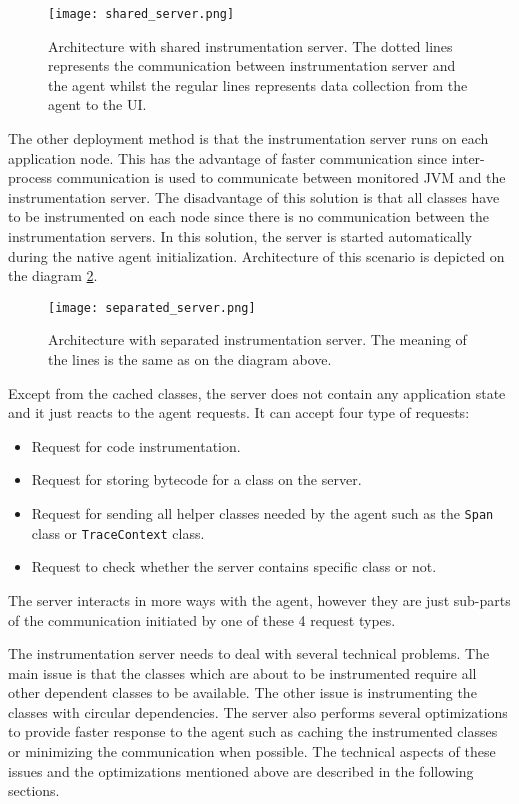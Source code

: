  \begin{figure}
 	\centering
 	\texttt{[image: shared\_server.png]}
 	\caption{Architecture with shared instrumentation server. The dotted lines represents the communication between instrumentation server and the agent whilst the regular lines represents data collection from the agent to the UI.}
 	\label{fig:shared_server}
 \end{figure}
 
 The other deployment method is that the instrumentation server runs on each application node. This has the advantage of faster communication since  inter-process communication is used to communicate between monitored JVM and the instrumentation server. The disadvantage of this solution is that all classes have to be instrumented on each node since there is no communication between the instrumentation servers. In this solution, the server is started automatically during the native agent initialization. Architecture of this scenario is depicted on the diagram \ref{fig:separated_server}.
 
 \begin{figure}
 	\centering
 	\texttt{[image: separated\_server.png]}
 	\caption{Architecture with separated instrumentation server. The meaning of the lines is the same as on the diagram above.}
 	\label{fig:separated_server}
 \end{figure}

Except from the cached classes, the server does not contain any application state and it just reacts to the agent requests. It can accept four type of requests:
\begin{itemize}
	\item Request for code instrumentation.
	\item Request for storing bytecode for a class on the server.
	\item Request for sending all helper classes needed by the agent such as the \texttt{Span} class or \texttt{TraceContext} class.
	\item Request to check whether the server contains specific class or not.
\end{itemize}
The server interacts in more ways with the agent, however they are just sub-parts of the communication initiated by one of these 4 request types.	

The instrumentation server needs to deal with several technical problems. The main issue is that the classes which are about to be instrumented require all other dependent classes to be available. The other issue is instrumenting the classes with circular dependencies. The server also performs several optimizations to provide faster response to the agent such as caching the instrumented classes or minimizing the communication when possible. The technical aspects of these issues and the optimizations mentioned above are described in the following sections.
